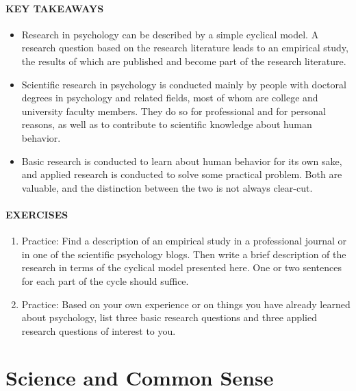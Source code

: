 \documentclass[
]{krantz}
\providecommand{\tightlist}{%
  \setlength{\itemsep}{0pt}\setlength{\parskip}{0pt}}
\begin{document}
\paragraph*{KEY TAKEAWAYS}\label{key-takeaways-1}

\begin{itemize}
\tightlist
\item
  Research in psychology can be described by a simple cyclical model. A research question based on the research literature leads to an empirical study, the results of which are published and become part of the research literature.
\item
  Scientific research in psychology is conducted mainly by people with doctoral degrees in psychology and related fields, most of whom are college and university faculty members. They do so for professional and for personal reasons, as well as to contribute to scientific knowledge about human behavior.
\item
  Basic research is conducted to learn about human behavior for its own sake, and applied research is conducted to solve some practical problem. Both are valuable, and the distinction between the two is not always clear-cut.
\end{itemize}

\paragraph*{EXERCISES}\label{exercises-1}

\begin{enumerate}
\def\labelenumi{\arabic{enumi}.}
\tightlist
\item
  Practice: Find a description of an empirical study in a professional journal or in one of the scientific psychology blogs. Then write a brief description of the research in terms of the cyclical model presented here. One or two sentences for each part of the cycle should suffice.
\item
  Practice: Based on your own experience or on things you have already learned about psychology, list three basic research questions and three applied research questions of interest to you.
\end{enumerate}

\section{Science and Common Sense}\label{science-and-common-sense}
\end{document}
